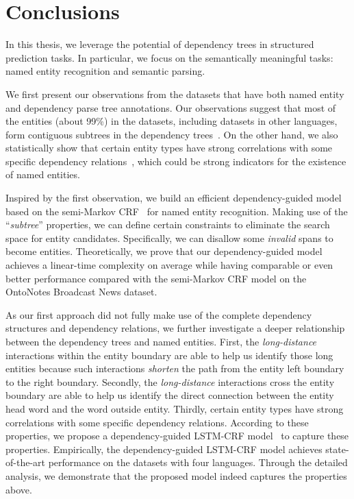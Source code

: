 \chapter{Conclusions} %

\label{Chapter8}



In this thesis, we leverage the potential of dependency trees in structured prediction tasks. 
In particular, we focus on the semantically meaningful tasks: named entity recognition and semantic parsing. 

We first present our observations from the datasets that have both named entity and dependency parse tree annotations.
Our observations suggest that most of the entities (about 99\%) in the datasets, including datasets in other languages, form contiguous subtrees in the dependency trees~\cite{jie2017efficient}. 
On the other hand, we also statistically show that certain entity types have strong correlations with some specific dependency relations~\cite{jie2019dependency}, which could be strong indicators for the existence of named entities.

Inspired by the first observation, we build an efficient dependency-guided model~\cite{jie2017efficient} based on the semi-Markov CRF~\cite{sarawagi2004semi} for named entity recognition. 
Making use of the ``\textit{subtree}'' properties, we can define certain constraints to eliminate the search space for entity candidates. 
Specifically, we can disallow some \textit{invalid} spans to become entities. 
Theoretically, we prove that our dependency-guided model achieves a linear-time complexity on average while having comparable or even better performance compared with the semi-Markov CRF model on the OntoNotes Broadcast News dataset. 


As our first approach did not fully make use of the complete dependency structures and dependency relations, we further investigate a deeper relationship between the dependency trees and named entities. 
First, the \textit{long-distance} interactions within the entity boundary are able to help us identify those long entities because such interactions \textit{shorten} the path from the entity left boundary to the right boundary. 
Secondly, the \textit{long-distance} interactions cross the entity boundary are able to help us identify the direct connection between the entity head word and the word outside entity.
Thirdly, certain entity types have strong correlations with some specific dependency relations. 
According to these properties, we propose a dependency-guided LSTM-CRF model~\cite{jie2019dependency} to capture these properties.
Empirically, the dependency-guided LSTM-CRF model achieves state-of-the-art performance on the datasets with four languages. 
Through the detailed analysis, we demonstrate that the proposed model indeed captures the properties above. 

